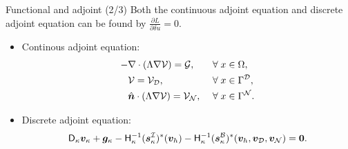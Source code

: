 \documentclass{beamer}
\begin{document}
\begin{frame}{Functional and adjoint (2/3)}
    Both the continuous adjoint equation and discrete adjoint equation can be found by $\frac{\partial L}{\partial \delta u} = 0$.
    \begin{itemize}
        \item Continous adjoint equation:
        \begin{equation*}
        \begin{aligned}
        -&\nabla\cdot\left(\Lambda \nabla\mathcal{V} \right) = \mathcal{G},\quad &&\forall \; x \in \Omega, \\
        &\mathcal{V} = \mathcal{V}_{\mathcal{D}}, \quad &&\forall \; x \in \Gamma^{\mathcal{D}},  \\
        &\hat{\bm{n}} \cdot \left( \Lambda \nabla \mathcal{V}\right) = \mathcal{V}_{\mathcal{N}},
        &&\forall \; x \in \Gamma^{\mathcal{N}}.
        \end{aligned}
        \end{equation*}
        \item Discrete adjoint equation:
        \begin{equation*}\label{eq:adjoint_SBP}
        \mathsf{D}_{\kappa} \bm{v}_\kappa + \bm{g}_{\kappa}
        - \mathsf{H}_{\kappa}^{-1} (\bm{s}_{\kappa}^{\mathcal{I}})^{*}(\bm{v}_h)
        - \mathsf{H}_{\kappa}^{-1} (\bm{s}_{\kappa}^{\mathcal{B}})^{*}(\bm{v}_h,\bm{v}_{\mathcal{D}},\bm{v}_{\mathcal{N}})
        = \bm{0}.
        \end{equation*}
    \end{itemize}
\end{frame}
\end{document}
